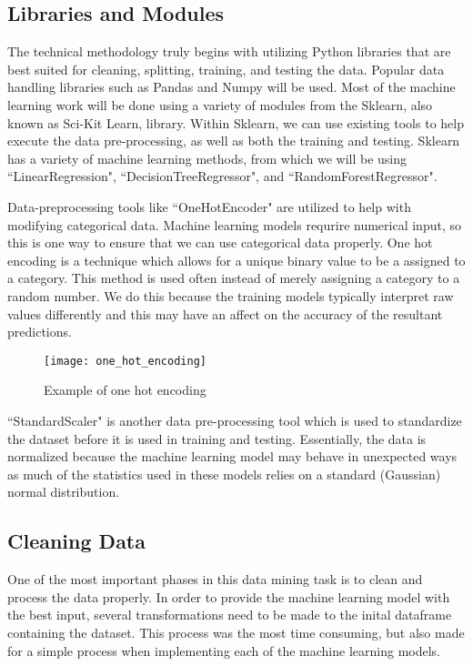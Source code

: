 \documentclass[12pt]{article}
\begin{document}
    \subsection{Libraries and Modules}
    The technical methodology truly begins with utilizing Python libraries that are best suited for cleaning, 
    splitting, training, and testing the data. Popular data handling libraries such as Pandas and Numpy will be used. 
    Most of the machine learning work will be done using a variety of modules from the Sklearn, also known as Sci-Kit Learn, library. Within Sklearn, we can 
    use existing tools to help execute the data pre-processing, as well as both the training and testing. Sklearn has a variety
    of machine learning methods, from which we will be using ``LinearRegression", ``DecisionTreeRegressor", and ``RandomForestRegressor".

    Data-preprocessing tools like ``OneHotEncoder" are utilized to help with modifying categorical data. Machine learning models requrire
    numerical input, so this is one way to ensure that we can use categorical data properly. One hot encoding is a technique which allows 
    for a unique binary value to be a assigned to a category. This method is used often instead of merely assigning a category to a random 
    number. We do this because the training models typically interpret raw values differently and this may have an affect on the accuracy of 
    the resultant predictions\cite{onehot}.

    \begin{figure}[H]
        \centering
        \texttt{[image: one\_hot\_encoding]}
        \caption{Example of one hot encoding\cite{onehot2}}
    \end{figure}

    ``StandardScaler" is another data pre-processing tool which is used to standardize the dataset before it is used in training 
    and testing. Essentially, the data is normalized because the machine learning model may behave in unexpected ways as much of the 
    statistics used in these models relies on a standard (Gaussian) normal distribution\cite{sscaler}.
    
    \subsection{Cleaning Data}
    One of the most important phases in this data mining task is to clean and process the data properly. 
    In order to provide the machine learning model with the best input, several transformations need to be
    made to the inital dataframe containing the dataset. This process was the most time consuming, but also 
    made for a simple process when implementing each of the machine learning models.
    
\end{document}
